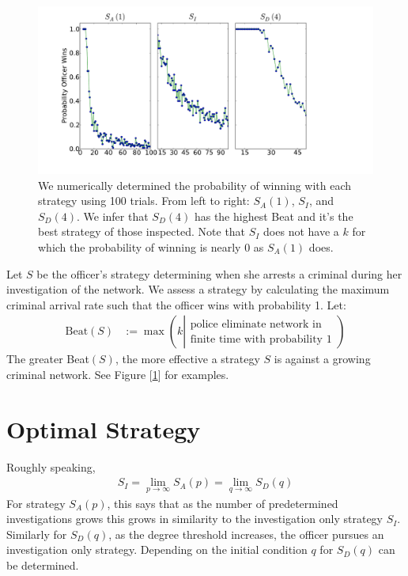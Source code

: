 \documentclass[%
 reprint,
 amsmath,amssymb,
 aps,
]{revtex4-1}
\theoremstyle{plain}
\theoremstyle{definition}
\begin{document}
 \begin{figure}\centering
  \includegraphics[width=\textwidth]{Strategies.pdf}
 \caption{We numerically determined the probability of winning with each strategy using 100 trials.  From left to right: $S_A(1)$, $S_I$, and $S_D(4)$.  We infer that $S_D(4)$ has the highest Beat and it's the best strategy of those inspected.  Note that $S_I$ does not have a $k$ for which the probability of winning is nearly 0 as $S_A(1)$ does.}
 \label{beats}
 \end{figure}
 
 
Let $S$ be the officer's strategy determining when she arrests a criminal during her investigation of the network.  We assess a strategy by calculating the maximum criminal arrival rate such that the officer wins with probability 1.  Let:
\begin{align}
\textrm{Beat}(S) &:=\max\left(k \left| \substack{\textrm{police eliminate network in}\\ \textrm{finite time with probability 1}}\right.\right)
\end{align}
The greater Beat$(S)$, the more effective a strategy $S$ is against a growing criminal network.  See Figure [\ref{beats}] for examples.

 \section{Optimal Strategy}
 
 Roughly speaking, 
 \begin{align}
 S_I = \lim_{p \to \infty} S_A(p) = \lim_{q \to \infty} S_D(q)
 \end{align}
For strategy $S_A(p)$, this says that as the number of predetermined investigations grows this grows in similarity to the investigation only strategy $S_I$.  Similarly for $S_D(q)$, as the degree threshold increases, the officer pursues an investigation only strategy.  Depending on the initial condition $q$ for $S_D(q)$ can be determined.
\end{document}

